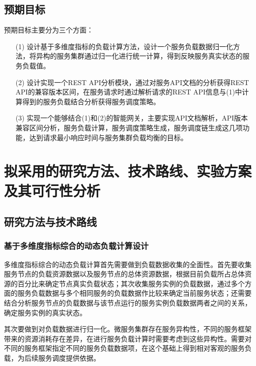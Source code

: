 \subsection{预期目标}

预期目标主要分为三个方面：

\begin{itemize}
    \item[(1)] 设计基于多维度指标的负载计算方法，设计一个服务负载数据归一化方法，将异构的服务集群通过归一化进行统一计算，得到反映服务真实状态的服务负载值。
    \item[(2)] 设计实现一个REST API分析模块，通过对服务API文档的分析获得REST API的兼容版本区间，在服务请求时通过解析请求的REST API信息与(1)中计算得到的服务负载结合分析获得服务调度策略。
    \item[(3)] 实现一个能够结合(1)和(2)的智能网关，主要实现API文档解析，API版本兼容区间分析，服务负载计算，服务调度策略生成，服务调度链生成这几项功能，达到请求最小响应时间与服务集群负载均衡的目标。
\end{itemize}

\newpage

\section{拟采用的研究方法、技术路线、实验方案及其可行性分析}

\subsection{研究方法与技术路线}

\subsubsection{基于多维度指标综合的动态负载计算设计}

多维度指标综合的动态负载计算首先需要做到负载数据收集的全面性。首先要收集服务节点的负载资源数据以及服务节点的总体资源数据，根据目前负载所占总体资源的百分比来确定节点真实负载状态；其次收集服务实例的负载数据，通过多个方面的服务负载数据与多个相同服务的负载数据作比较来确定当前服务状态；还需要结合分析服务节点的负载数据与该节点运行的服务实例负载数据两者之间的关系，确定服务实例的真实状态。 \par
其次要做到对负载数据进行归一化。微服务集群存在服务异构性，不同的服务框架带来的资源消耗存在差异，在进行服务负载计算时需要考虑到这些异构性。需要对不同的服务框架指定不同的服务负载数据项，在这个基础上得到相对客观的服务负载，为后续服务调度提供依据。

